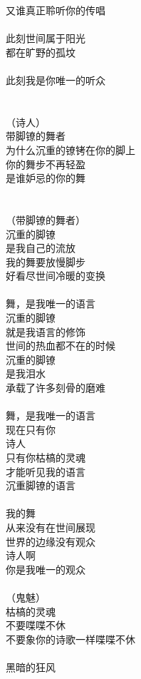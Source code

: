 又谁真正聆听你的传唱\\
\\
此刻世间属于阳光\\
都在旷野的孤坟\\
\\
此刻我是你唯一的听众\\
\\
\\
（诗人）\\
带脚镣的舞者\\
为什么沉重的镣铐在你的脚上\\
你的舞步不再轻盈\\
是谁妒忌的你的舞\\
\\
\\
（带脚镣的舞者）\\
沉重的脚镣\\
是我自己的流放\\
我的舞要放慢脚步\\
好看尽世间冷暖的变换\\
\\
舞，是我唯一的语言\\
沉重的脚镣\\
就是我语言的修饰\\
世间的热血都不在的时候\\
沉重的脚镣\\
是我泪水\\
承载了许多刻骨的磨难\\
\\
舞，是我唯一的语言\\
现在只有你\\
诗人\\
只有你枯槁的灵魂\\
才能听见我的语言\\
沉重脚镣的语言\\
\\
我的舞\\
从来没有在世间展现\\
世界的边缘没有观众\\
诗人啊\\
你是我唯一的观众\\
\\
（鬼魅）\\
枯槁的灵魂\\
不要喋喋不休\\
不要象你的诗歌一样喋喋不休\\
\\
黑暗的狂风\\
